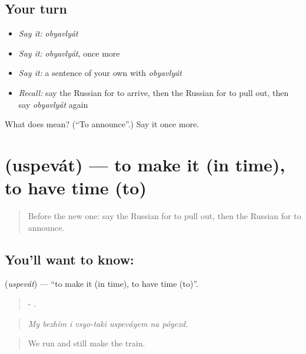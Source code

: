\subsection*{Your turn}
\begin{itemize}
\raggedright
  \item \emph{Say it:} \emph{obyavlyát}
  \item \emph{Say it:} \emph{obyavlyát}, once more
  \item \emph{Say it:} a sentence of your own with \emph{obyavlyát}
  \item \emph{Recall:} say the Russian for to arrive, then the Russian for to pull out, then say \emph{obyavlyát} again
\end{itemize}

\begin{tcolorbox}[breakable,colback=teal!4,colframe=teal!35!black,title={Before you move on}]
What does  mean? (\textquotedblleft{}To announce\textquotedblright{}.) Say it once more.
\end{tcolorbox}
\section[\texorpdfstring{\ru{успевать} (uspevát)}{успевать (uspevát)}]{ (uspevát) — to make it (in time), to have time (to)}

\label{lesson:RU-C415-uspevat}



\begin{quote}
Before the new one: say the Russian for to pull out, then the Russian for to announce.
\end{quote}

\subsection*{You'll want to know: }
\textbf{} (\emph{uspevát}) — \textquotedblleft{}to make it (in time), to have time (to)\textquotedblright{}.

\begin{quote}
   -   .
\end{quote}

\begin{quote}
\emph{My bezhím i vsyo-taki uspeváyem na póyezd.}
\end{quote}

\begin{quote}
We run and still make the train.
\end{quote}


